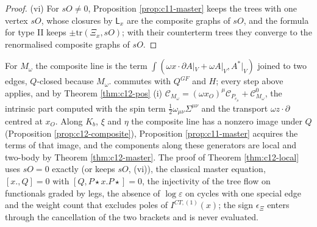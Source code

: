 \begin{proof}
(vi) For $sO\neq0$, Proposition \ref{prop:c11-master} keeps the trees with one vertex $sO$, whose closures by $\mathsf L_x$ are the composite graphs of $sO$, and the formula for type II keeps $\pm\mathrm{tr}(\Xi_x,sO)$; with their counterterm trees they converge to the renormalised composite graphs of $sO$.
\end{proof}

\begin{remark}
\label{rem:c12-localM}
For $M_\omega$ the composite line is the term $\int(\omega x\cdot\partial A|_V+\omega A|_V,A^*|_V)$ joined to two edges, $Q$-closed because $M_\omega.$ commutes with $Q^{GF}$ and $H$; every step above applies, and by Theorem \ref{thm:c12-pos} (i) $\mathcal C_{M_\omega}=(\omega x_O)^\mu\mathcal C_{P_{e_\mu}}+\mathcal C^0_{M_\omega}$, the intrinsic part computed with the spin term $\tfrac12\omega_{\mu\nu}\Sigma^{\mu\nu}$ and the transport $\omega z\cdot\partial$ centred at $x_O$. Along $K_b$, $\xi$ and $\eta$ the composite line has a nonzero image under $Q$ (Proposition \ref{prop:c12-composite}), Proposition \ref{prop:c11-master} acquires the terms of that image, and the components along these generators are local and two-body by Theorem \ref{thm:c12-master}. The proof of Theorem \ref{thm:c12-local} uses $sO=0$ exactly (or keeps $sO$, (vi)), the classical master equation, $[x.,Q]=0$ with $[Q,P\star x.P\star]=0$, the injectivity of the tree flow on functionals graded by legs, the absence of $\log\varepsilon$ on cycles with one special edge and the weight count that excludes poles of $I^{CT,(1)}(x)$; the sign $\epsilon_\Xi$ enters through the cancellation of the two brackets and is never evaluated.
\end{remark}

